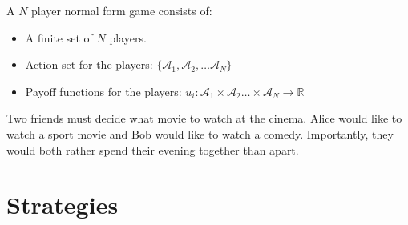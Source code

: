 \documentclass{beamer}              %
\begin{document}
\begin{frame}

    \begin{definition}
        A $N$ player normal form game consists of:

        \begin{itemize}
            \item A finite set of $N$ players.
            \item Action set for the players: $\{\mathcal{A}_1, \mathcal{A}_2, \dots \mathcal{A}_N\}$
            \item Payoff functions for the players: $u_i : \mathcal{A}_1 \times \mathcal{A}_2 \dots \times \mathcal{A}_N \to \mathbb{R}$
        \end{itemize}
    \end{definition}
\end{frame}

\begin{frame}
    \begin{example}
        Two friends must decide what movie to watch at the cinema. Alice would like
        to watch a sport movie and Bob would like to watch a comedy. Importantly,
        they would both rather spend their evening together than apart.
    \end{example}
\end{frame}


\section{Strategies}
\end{document}
